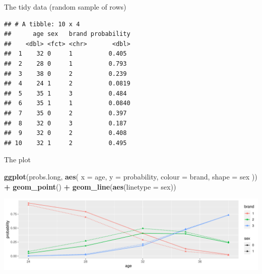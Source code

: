 \documentclass[
  ignorenonframetext,
]{beamer}
\newenvironment{Shaded}{\begin{snugshade}}{\end{snugshade}}
\newcommand{\DataTypeTok}[1]{\textcolor[rgb]{0.13,0.29,0.53}{#1}}
\newcommand{\DecValTok}[1]{\textcolor[rgb]{0.00,0.00,0.81}{#1}}
\newcommand{\KeywordTok}[1]{\textcolor[rgb]{0.13,0.29,0.53}{\textbf{#1}}}
\newcommand{\NormalTok}[1]{#1}
\newcommand{\OperatorTok}[1]{\textcolor[rgb]{0.81,0.36,0.00}{\textbf{#1}}}
\newcommand{\StringTok}[1]{\textcolor[rgb]{0.31,0.60,0.02}{#1}}
\begin{document}
\begin{frame}[fragile]{The tidy data (random sample of rows)}
\protect\hypertarget{the-tidy-data-random-sample-of-rows}{}

\small

\begin{Shaded}
\end{Shaded}

\begin{verbatim}
## # A tibble: 10 x 4
##      age sex   brand probability
##    <dbl> <fct> <chr>       <dbl>
##  1    32 0     1          0.405 
##  2    28 0     1          0.793 
##  3    38 0     2          0.239 
##  4    24 1     2          0.0819
##  5    35 1     3          0.484 
##  6    35 1     1          0.0840
##  7    35 0     2          0.397 
##  8    32 0     3          0.187 
##  9    32 0     2          0.408 
## 10    32 1     2          0.495
\end{verbatim}

\normalsize

\end{frame}

\begin{frame}[fragile]{The plot}
\protect\hypertarget{the-plot-1}{}

\begin{Shaded}
\begin{Highlighting}[]
\KeywordTok{ggplot}\NormalTok{(probs.long, }\KeywordTok{aes}\NormalTok{(}
  \DataTypeTok{x =}\NormalTok{ age, }\DataTypeTok{y =}\NormalTok{ probability,}
  \DataTypeTok{colour =}\NormalTok{ brand, }\DataTypeTok{shape =}\NormalTok{ sex}
\NormalTok{)) }\OperatorTok{+}
\StringTok{  }\KeywordTok{geom_point}\NormalTok{() }\OperatorTok{+}\StringTok{ }\KeywordTok{geom_line}\NormalTok{(}\KeywordTok{aes}\NormalTok{(}\DataTypeTok{linetype =}\NormalTok{ sex))}
\end{Highlighting}
\end{Shaded}

\includegraphics{slides_d29_files/figure-beamer/unnamed-chunk-140-1.pdf}

\end{frame}
\end{document}
